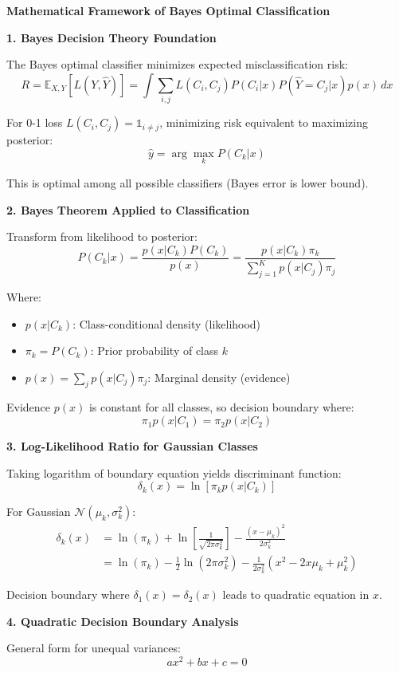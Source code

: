 \documentclass[12pt]{article}
\begin{document}
\begin{explanation}

\textbf{Mathematical Framework of Bayes Optimal Classification}

\textbf{1. Bayes Decision Theory Foundation}

The Bayes optimal classifier minimizes expected misclassification risk:
\[R = \mathbb{E}_{X,Y}[L(Y, \hat{Y})] = \int \sum_{i,j} L(C_i, C_j) P(C_i|x) P(\hat{Y} = C_j|x) p(x) \, dx\]

For 0-1 loss $L(C_i, C_j) = \mathbb{1}_{i \neq j}$, minimizing risk equivalent to maximizing posterior:
\[\hat{y} = \arg\max_k P(C_k|x)\]

This is optimal among all possible classifiers (Bayes error is lower bound).

\textbf{2. Bayes Theorem Applied to Classification}

Transform from likelihood to posterior:
\[P(C_k|x) = \frac{p(x|C_k) P(C_k)}{p(x)} = \frac{p(x|C_k) \pi_k}{\sum_{j=1}^K p(x|C_j) \pi_j}\]

Where:
\begin{itemize}
\item $p(x|C_k)$: Class-conditional density (likelihood)
\item $\pi_k = P(C_k)$: Prior probability of class $k$
\item $p(x) = \sum_j p(x|C_j)\pi_j$: Marginal density (evidence)
\end{itemize}

Evidence $p(x)$ is constant for all classes, so decision boundary where:
\[\pi_1 p(x|C_1) = \pi_2 p(x|C_2)\]

\textbf{3. Log-Likelihood Ratio for Gaussian Classes}

Taking logarithm of boundary equation yields discriminant function:
\[\delta_k(x) = \ln[\pi_k p(x|C_k)]\]

For Gaussian $\mathcal{N}(\mu_k, \sigma_k^2)$:
\begin{align*}
\delta_k(x) &= \ln(\pi_k) + \ln\left[\frac{1}{\sqrt{2\pi\sigma_k^2}}\right] - \frac{(x-\mu_k)^2}{2\sigma_k^2} \\
&= \ln(\pi_k) - \frac{1}{2}\ln(2\pi\sigma_k^2) - \frac{1}{2\sigma_k^2}(x^2 - 2x\mu_k + \mu_k^2)
\end{align*}

Decision boundary where $\delta_1(x) = \delta_2(x)$ leads to quadratic equation in $x$.

\textbf{4. Quadratic Decision Boundary Analysis}

General form for unequal variances:
\[a x^2 + b x + c = 0\]


\end{explanation}
\end{document}
